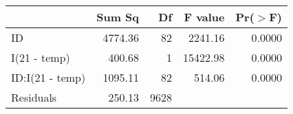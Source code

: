 \begin{table}[ht]
\centering
\begin{tabular}{lrrrr}
  \hline
 & Sum Sq & Df & F value & Pr($>$F) \\ 
  \hline
ID & 4774.36 & 82 & 2241.16 & 0.0000 \\ 
  I(21 - temp) & 400.68 & 1 & 15422.98 & 0.0000 \\ 
  ID:I(21 - temp) & 1095.11 & 82 & 514.06 & 0.0000 \\ 
  Residuals & 250.13 & 9628 &  &  \\ 
   \hline
\end{tabular}
\end{table}
